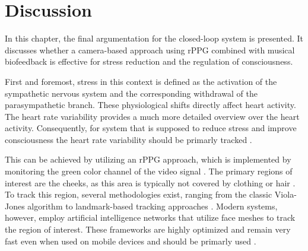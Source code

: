 \section{Discussion}

In this chapter, the final argumentation for the closed-loop system is presented. It discusses whether a camera-based approach using rPPG combined with musical biofeedback is effective for stress reduction and the regulation of consciousness.

First and foremost, stress in this context is defined as the activation of the sympathetic nervous system and the corresponding withdrawal of the parasympathetic branch. These physiological shifts directly affect heart activity. The heart rate variability provides a much more detailed overview over the heart activity. Consequently, for system that is supposed to reduce stress and improve consciousness the heart rate variability should be primarly tracked \cite{mcewen2017neurobiology} \cite{shaffer2017overview}.

This can be achieved by utilizing an rPPG approach, which is implemented by monitoring the green color channel of the video signal \cite{verkruysse2008remote}. The primary regions of interest are the cheeks, as this area is typically not covered by clothing or hair \cite{lempe2013roi}. To track this region, several methodologies exist, ranging from the classic Viola-Jones algorithm to landmark-based tracking approaches \cite{li2014remote} \cite{poh2010non}. Modern systems, however, employ artificial intelligence networks that utilize face meshes to track the region of interest. These frameworks are highly optimized and remain very fast even when used on mobile devices and should be primarly used \cite{kartynnik2019real}.

